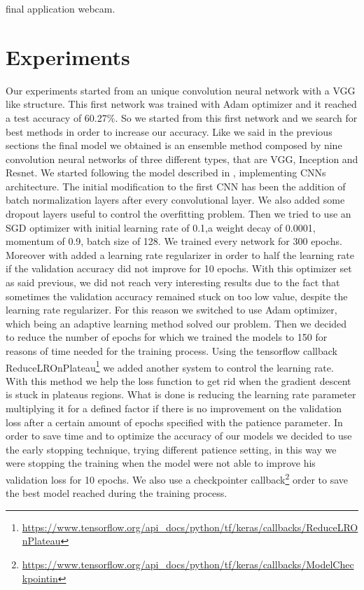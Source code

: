 \documentclass[10pt,twocolumn,letterpaper]{article}
\begin{document}
final application webcam.
\section{Experiments}
Our experiments started from an unique convolution neural network with a VGG like structure.
This first network was trained with Adam optimizer and it reached a test accuracy of 60.27\%.
So we started from this first network and we search for best methods in order to increase our accuracy.
Like we said in the previous sections the final model we obtained is an ensemble method composed by nine convolution neural networks
of three different types, that are VGG, Inception and Resnet.
We started following the model described in \cite{147}, implementing CNNs architecture.
The initial modification to the first CNN has been the addition of batch normalization layers after every convolutional layer.
We also added some dropout layers useful to control the overfitting problem.
Then we tried to use an SGD optimizer with initial learning rate of 0.1,a weight decay of 0.0001, momentum of 0.9, batch size of 128.
We trained every network for 300 epochs.
Moreover with added a learning rate regularizer in order to half the learning rate if the validation accuracy did not improve for 10 epochs.
With this optimizer set as said previous, we did not reach very interesting results due to the fact that sometimes the validation accuracy
remained stuck on too low value, despite the learning rate regularizer.
For this reason we switched to use Adam optimizer, which being an adaptive learning method solved our problem.
Then we decided to reduce the number of epochs for which we trained the models to 150 for
reasons of time needed for the training process.
Using the tensorflow callback ReduceLROnPlateau\footnote{\url{https://www.tensorflow.org/api_docs/python/tf/keras/callbacks/ReduceLROnPlateau}} 
we added another system to control the learning rate. With this method we help the loss function to get rid when the gradient descent is stuck in plateaus regions.
What is done is reducing the learning rate parameter multiplying it for a defined factor if there is no improvement on the validation loss after a certain amount of epochs specified with the patience parameter.
In order to save time and to optimize the accuracy of our models we decided to use the early stopping technique, trying different patience setting,
in this way we were stopping the training when the model were not able to improve his validation loss for 10 epochs.
We also use a checkpointer callback\footnote{\url{https://www.tensorflow.org/api_docs/python/tf/keras/callbacks/ModelCheckpointin}} order to save the best model reached during the training process.
\end{document}
